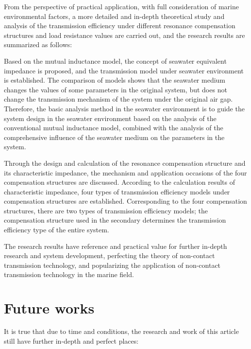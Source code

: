 From the perspective of practical application, with full consideration of marine environmental factors, a more detailed and in-depth theoretical study and analysis of the transmission efficiency under different resonance compensation structures and load resistance values are carried out, and the research results are summarized as follows:

Based on the mutual inductance model, the concept of seawater equivalent impedance is proposed, and the transmission model under seawater environment is established. The comparison of models shows that the seawater medium changes the values of some parameters in the original system, but does not change the transmission mechanism of the system under the original air gap. Therefore, the basic analysis method in the seawater environment is to guide the system design in the seawater environment based on the analysis of the conventional mutual inductance model, combined with the analysis of the comprehensive influence of the seawater medium on the parameters in the system.

Through the design and calculation of the resonance compensation structure and its characteristic impedance, the mechanism and application occasions of the four compensation structures are discussed. According to the calculation results of characteristic impedance, four types of transmission efficiency models under compensation structures are established. Corresponding to the four compensation structures, there are two types of transmission efficiency models; the compensation structure used in the secondary determines the transmission efficiency type of the entire system.

The research results have reference and practical value for further in-depth research and system development, perfecting the theory of non-contact transmission technology, and popularizing the application of non-contact transmission technology in the marine field.
\section{Future works}
It is true that due to time and conditions, the research and work of this article still have further in-depth and perfect places:


